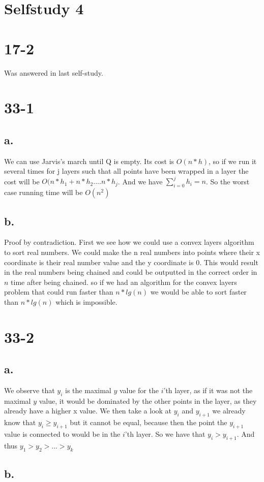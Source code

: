 \documentclass[12pt,a4paper]{report}
\begin{document}
\section*{Selfstudy 4}
\section*{17-2}
Was answered in last self-study.

\section*{33-1}
\subsection*{a.}
We can use Jarvis's march until Q is empty.  Its cost is $O(n*h)$, so if we run it several times for j layers such that all points have been wrapped in a layer the cost will be $O(n*h_1 + n*h_2 .... n*h_j$. And we have $\sum\limits_{i=0}^j{h_i} = n$. So the worst case running time will be $O(n^2)$

\subsection*{b.}
Proof by contradiction.
First we see how we could use a convex layers algorithm to sort real numbers.
We could make the n real numbers into points where their x coordinate is their real number value and the y coordinate is 0.
This would result in the real numbers being chained and could be outputted in the correct order in $n$ time after being chained.
so if we had an algorithm for the convex layers problem that could run faster than $n*lg(n)$ we would  be able to sort faster than $n*lg(n)$ which is impossible.

\section*{33-2}
\subsection*{a.}
We observe that $y_i$ is the maximal $y$ value for the $i$'th layer, as if it was not the maximal $y$ value, it would be dominated by the other points in the layer, as they already have a higher x value.
We then take a look at $y_i$ and $y_{i+1}$ we already know that $y_i \geq y_{i+1}$ but it cannot be equal, because then the point the $y_{i+1}$ value is connected to would be in the $i$'th layer. So we have that $y_{i} > y_{i+1}$.
And thus $y_1 > y_2 > ... > y_k$

\subsection*{b.}
\end{document}
